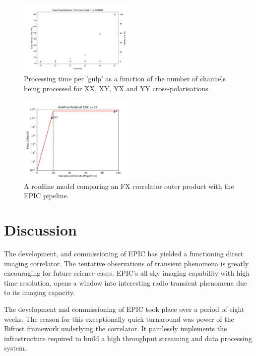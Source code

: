 \documentclass[bibliography=totocnumbered, twocolumn]{article}
\begin{document}
\begin{figure}
  \centering
  \includegraphics[width=0.5\textwidth]{images/dual_pol_throughput.pdf}
  \caption{Processing time per 'gulp' as a function of the number of channels being processed for XX, XY, YX and YY cross-polarisations.}
  \label{fig:doublepol_time}
\end{figure}

\begin{figure}
  \centering
  \includegraphics[width=0.5\textwidth]{images/epic_fx_roofline.pdf}
  \caption{A roofline model comparing an FX correlator outer product with the EPIC pipeline.}
  \label{fig:epic_roofline}
\end{figure}


\section{Discussion} \label{sec:discussion}

The development, and commissioning of EPIC has yielded a functioning
direct imaging correlator. The tentative observations of transient
phenomena is greatly encouraging for future science cases. EPIC's all
sky imaging capability with high time resolution, opens a window into
interesting radio transient phenomena due to its imaging capacity.

The development and commissioning of EPIC took place over a period of
eight weeks. The reason for this exceptionally quick turnaround was
power of the Bifrost framework underlying the correlator. It painlessly
implements the infrastructure required to build a high throughput
streaming and data processing system.
\end{document}
